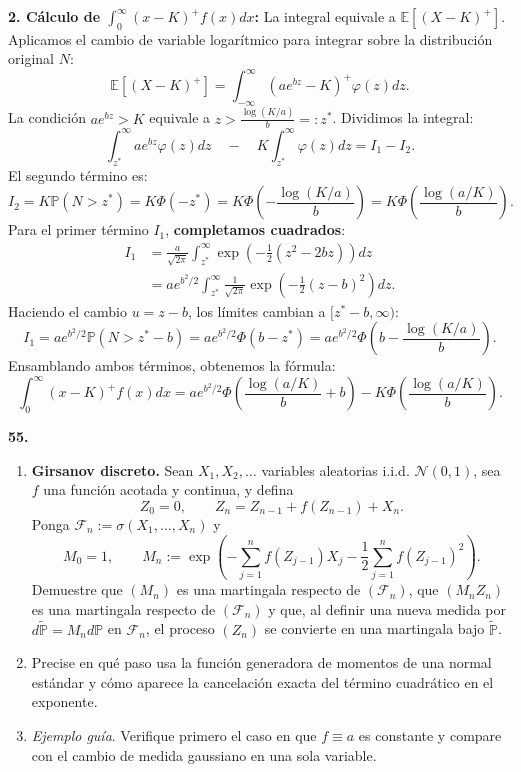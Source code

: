 \documentclass[11pt, letterpaper]{article}
\begin{document}
\begin{solucion}
    \textbf{2. Cálculo de $\int_{0}^{\infty}(x-K)^{+}f(x)dx$:}
    La integral equivale a $\mathbb{E}[(X-K)^+]$. Aplicamos el cambio de variable logarítmico para integrar sobre la distribución original $N$:
    \[ \mathbb{E}[(X-K)^+] = \int_{-\infty}^{\infty} (a e^{bz} - K)^+ \varphi(z) dz. \]
    La condición $a e^{bz} > K$ equivale a $z > \frac{\log(K/a)}{b} =: z^*$. Dividimos la integral:
    \[ \int_{z^*}^{\infty} a e^{bz} \varphi(z) dz \quad - \quad K \int_{z^*}^{\infty} \varphi(z) dz = I_1 - I_2. \]
    El segundo término es:
    \[ I_2 = K \mathbb{P}(N > z^*) = K \Phi(-z^*) = K \Phi\left(-\frac{\log(K/a)}{b}\right) = K \Phi\left(\frac{\log(a/K)}{b}\right). \]
    Para el primer término $I_1$, \textbf{completamos cuadrados}:
    \begin{align*}
        I_1 &= \frac{a}{\sqrt{2\pi}} \int_{z^*}^{\infty} \exp\left(-\frac{1}{2}(z^2 - 2bz)\right) dz \\
        &= a e^{b^2/2} \int_{z^*}^{\infty} \frac{1}{\sqrt{2\pi}} \exp\left(-\frac{1}{2}(z-b)^2\right) dz.
    \end{align*}
    Haciendo el cambio $u = z - b$, los límites cambian a $[z^* - b, \infty)$:
    \[ I_1 = a e^{b^2/2} \mathbb{P}(N > z^* - b) = a e^{b^2/2} \Phi(b - z^*) = a e^{b^2/2} \Phi\left(b - \frac{\log(K/a)}{b}\right). \]
    Ensamblando ambos términos, obtenemos la fórmula:
    \[ \int_{0}^{\infty}(x-K)^{+}f(x)dx = a e^{b^2/2} \Phi\left(\frac{\log(a/K)}{b} + b\right) - K \Phi\left(\frac{\log(a/K)}{b}\right). \]
\end{solucion}

\newpage

\begin{ejercicio}
    \textbf{55.} 
    \begin{enumerate}
        \item \textbf{Girsanov discreto.} Sean $X_{1},X_{2},\dots$ variables aleatorias i.i.d. $\mathcal{N}(0,1)$, sea $f$ una función acotada y continua, y defina
        \[ Z_{0}=0, \qquad Z_{n}=Z_{n-1}+f(Z_{n-1})+X_{n}. \]
        Ponga $\mathcal{F}_{n}:=\sigma(X_{1},\dots,X_{n})$ y
        \[ M_{0}=1, \qquad M_{n}:=\exp\left(-\sum_{j=1}^{n}f(Z_{j-1})X_{j}-\frac{1}{2}\sum_{j=1}^{n}f(Z_{j-1})^{2}\right). \]
        Demuestre que $(M_{n})$ es una martingala respecto de $(\mathcal{F}_{n})$, que $(M_{n}Z_{n})$ es una martingala respecto de $(\mathcal{F}_{n})$ y que, al definir una nueva medida por $d\tilde{\mathbb{P}}=M_{n}d\mathbb{P}$ en $\mathcal{F}_{n}$, el proceso $(Z_{n})$ se convierte en una martingala bajo $\tilde{\mathbb{P}}$.
        \item Precise en qué paso usa la función generadora de momentos de una normal estándar y cómo aparece la cancelación exacta del término cuadrático en el exponente.
        \item \textit{Ejemplo guía}. Verifique primero el caso en que $f\equiv a$ es constante y compare con el cambio de medida gaussiano en una sola variable.
    \end{enumerate}
\end{ejercicio}
\end{document}
